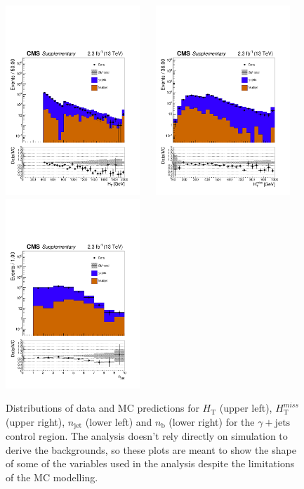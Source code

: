 \clearpage
\begin{figure}[tbhp]
    \caption{ 
    Distributions of data and MC predictions for $H_{\mathrm{T}}$
    (upper left), $H_{\mathrm{T}}^{miss}$ (upper right),
    $n_{\mathrm{jet}}$ (lower left) and $n_{\mathrm{b}}$ (lower right)  
    for the $\gamma+\mathrm{jets}$ control region. 
    The analysis doesn't rely directly on simulation to derive the backgrounds, 
    so these plots are meant to show the shape of some of the variables used in the analysis despite the limitations 
    of the MC modelling. 
    \label{fig:data-MC_plots_SinglePhoton} }
  \begin{center}
     \includegraphics[width=0.45\textwidth]{SinglePhoton_ht40_all_all_aux} ~~
     \includegraphics[width=0.45\textwidth]{SinglePhoton_mht40_pt_all_all_aux} \\
     \includegraphics[width=0.45\textwidth]{SinglePhoton_nJet40_all_all_aux} ~~

\end{center}
\end{figure}
